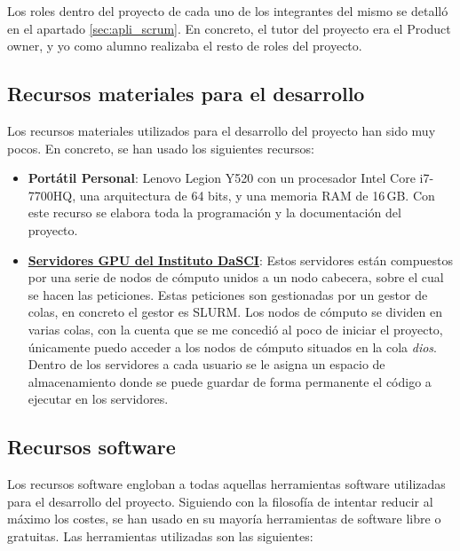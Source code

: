 Los roles dentro del proyecto de cada uno de los integrantes del mismo se detalló en el apartado \ref{sec:apli_scrum}. En concreto, el tutor del proyecto era el Product owner, y yo como alumno realizaba el resto de roles del proyecto.

\subsection{Recursos materiales para el desarrollo}

Los recursos materiales utilizados para el desarrollo del proyecto han sido muy pocos. En concreto, se han usado los siguientes recursos:

\begin{itemize}
\item \textbf{Portátil Personal}: Lenovo Legion Y520 con un procesador Intel Core i7-7700HQ, una arquitectura de 64 bits, y una memoria RAM de 16 GB. Con este recurso se elabora toda la programación y la documentación del proyecto.
\item \textbf{\href{https://dasci.es/es/sobre-dasci/recursos/recursos-tecnologicos/}{Servidores GPU del Instituto DaSCI}}: Estos servidores están compuestos por una serie de nodos de cómputo unidos a un nodo cabecera, sobre el cual se hacen las peticiones. Estas peticiones son gestionadas por un gestor de colas, en concreto el gestor es SLURM. Los nodos de cómputo se dividen en varias colas, con la cuenta que se me concedió al poco de iniciar el proyecto, únicamente puedo acceder a los nodos de cómputo situados en la cola \textit{dios}. Dentro de los servidores a cada usuario se le asigna un espacio de almacenamiento donde se puede guardar de forma permanente el código a ejecutar en los servidores.
\end{itemize}

\subsection{Recursos software} \label{subsec:recur_software}

Los recursos software engloban a todas aquellas herramientas software utilizadas para el desarrollo del proyecto. Siguiendo con la filosofía de intentar reducir al máximo los costes, se han usado en su mayoría herramientas de software libre o gratuitas. Las herramientas utilizadas son las siguientes:

